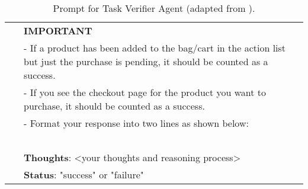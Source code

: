 \begin{table*}[htbp]
\begin{tabular}{lp{12cm}}
\cmidrule{2-2}
& \textbf{IMPORTANT}\\
& - If a product has been added to the bag/cart in the action list but just the purchase is pending, it should be counted as a success.\\
& - If you see the checkout page for the product you want to purchase, it should be counted as a success.\\
& - Format your response into two lines as shown below:\\~\\
& \textbf{Thoughts}: <your thoughts and reasoning process>\\
& \textbf{Status}: "success" or "failure"\\
    \bottomrule        
    \end{tabular}
    \caption{Prompt for Task Verifier Agent (adapted from \citet{DBLP:journals/corr/abs-2404-06474}).}
    \label{tab:verifier_prompt}
\end{table*}